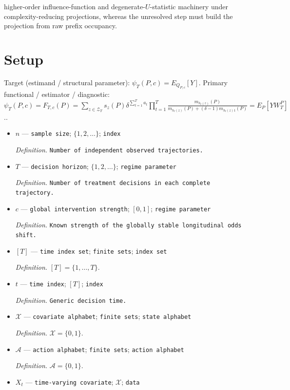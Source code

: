 \documentclass{article}
\begin{document}
higher-order influence-function and degenerate-\(U\)-statistic machinery under complexity-reducing projections, whereas the unresolved step must build the projection from raw prefix occupancy.

\section{Setup}

Target (estimand / structural parameter): \(\psi_T(P,c)=E_{Q_{P,c}}[Y]\).
Primary functional / estimator / diagnostic: \(\psi_T(P,c)=F_{T,c}(P)=\sum_{z\in\mathcal Z_T}s_z(P)\delta^{\sum_{t=1}^T a_t}\prod_{t=1}^T\frac{m_{h_t(z)}(P)}{m_{h_t(z)}(P)+(\delta-1)m_{h_t(z)1}(P)}=E_P[YW_T^P]\)..
\begin{itemize}
  \item \(n\) --- \texttt{sample size}; \(\{1,2,\ldots\}\); \texttt{index}
  \par\smallskip\noindent\emph{Definition.} \texttt{Number of independent observed trajectories.}
  \item \(T\) --- \texttt{decision horizon}; \(\{1,2,\ldots\}\); \texttt{regime parameter}
  \par\smallskip\noindent\emph{Definition.} \texttt{Number of treatment decisions in each complete trajectory.}
  \item \(c\) --- \texttt{global intervention strength}; \([0,1]\); \texttt{regime parameter}
  \par\smallskip\noindent\emph{Definition.} \texttt{Known strength of the globally stable longitudinal odds shift.}
  \item \([T]\) --- \texttt{time index set}; \texttt{finite sets}; \texttt{index set}
  \par\smallskip\noindent\emph{Definition.} \([T]=\{1,\ldots,T\}\).
  \item \(t\) --- \texttt{time index}; \([T]\); \texttt{index}
  \par\smallskip\noindent\emph{Definition.} \texttt{Generic decision time.}
  \item \(\mathcal X\) --- \texttt{covariate alphabet}; \texttt{finite sets}; \texttt{state alphabet}
  \par\smallskip\noindent\emph{Definition.} \(\mathcal X=\{0,1\}\).
  \item \(\mathcal A\) --- \texttt{action alphabet}; \texttt{finite sets}; \texttt{action alphabet}
  \par\smallskip\noindent\emph{Definition.} \(\mathcal A=\{0,1\}\).
  \item \(X_t\) --- \texttt{time-\allowbreak{}varying covariate}; \(\mathcal X\); \texttt{data}

\end{itemize}
\end{document}
